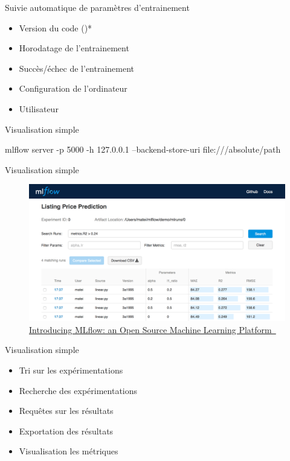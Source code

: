 \documentclass[aspectratio=169,10pt,xcolor=x11names,english,french]{beamer}
\makeatletter
\newenvironment{Scode}{%
	\def\FrameCommand##1{\hskip\@totalleftmargin
		\vrule width 3pt\colorbox{codebg}{\hspace{5pt}##1}%
		\hskip-\linewidth \hskip-\@totalleftmargin \hskip\columnwidth}%
	\MakeFramed {\advance\hsize-\width
		\@totalleftmargin\z@ \linewidth\hsize
		\advance\labelsep\fboxsep
		\@setminipage}%
}{\par\unskip\@minipagefalse\endMakeFramed}
\newcommand{\link}[2]{\href{#1}{#2~{\smaller\faExternalLink*}}}
\makeatother
\begin{document}
	\begin{frame}{Suivie automatique de paramètres d'entrainement}
		\begin{itemize}
			\item Version du code (\faGit)*
			\item Horodatage de l'entrainement
			\item Succès/échec de l'entrainement
			\item Configuration de l'ordinateur
			\item Utilisateur
		\end{itemize}
	\end{frame}

	\begin{frame}{Visualisation simple}
		\begin{Scode}
			mlflow server -p 5000 -h 127.0.0.1 --backend-store-uri file:///absolute/path
		\end{Scode}
	\end{frame}

	\begin{frame}{Visualisation simple}
		\centering
		\begin{figure}
			\includegraphics[width=\linewidth,keepaspectratio, height=0.7\textheight]{img/mlflow-ui.png}
			\caption{\link{https://databricks.com/blog/2018/06/05/introducing-mlflow-an-open-source-machine-learning-platform.html}{Introducing MLflow: an Open Source Machine Learning Platform}}
		\end{figure}
	\end{frame}

	\begin{frame}{Visualisation simple}
		\begin{itemize}
			\item Tri sur les expérimentations
			\item Recherche des expérimentations
			\item Requêtes sur les résultats
			\item Exportation des résultats
			\item Visualisation les métriques
		\end{itemize}
	\end{frame}
\end{document}

